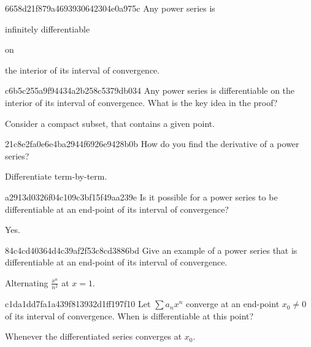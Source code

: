 \begin{note}{6658d21f879a4693930642304e0a975c}
    Any power series is \begin{icloze}{2}infinitely differentiable\end{icloze} on \begin{icloze}{1}the interior of its interval of convergence.\end{icloze}
\end{note}

\begin{note}{c6b5c255a9f94434a2b258c5379db034}
    Any power series is differentiable on the interior of its interval of convergence.
    What is the key idea in the proof?

    \begin{cloze}{1}
        Consider a compact subset, that contains a given point.
    \end{cloze}
\end{note}

\begin{note}{21c8e2fa0e6e4ba2944f6926e9428b0b}
    How do you find the derivative of a power series?

    \begin{cloze}{1}
        Differentiate term-by-term.
    \end{cloze}
\end{note}

\begin{note}{a2913d0326f04c109c3bf15f49aa239e}
    Is it possible for a power series to be differentiable at an end-point of its interval of convergence?

    \begin{cloze}{1}
        Yes.
    \end{cloze}
\end{note}

\begin{note}{84c4cd40364d4c39af2f53c8cd3886bd}
    Give an example of a power series that is differentiable at an end-point of its interval of convergence.

    \begin{cloze}{1}
        Alternating \({ \frac{x^{n}}{n^2} }\) at \({ x = 1 }\).
    \end{cloze}
\end{note}

\begin{note}{c1da1dd7fa1a439f813932d1ff197f10}
    Let \({ \sum a_n x^{n} }\) converge at an end-point \({ x_0 \neq 0 }\) of its interval of convergence.
    When is differentiable at this point?

    \begin{cloze}{1}
        Whenever the differentiated series converges at \({ x_0 }\).
    \end{cloze}
\end{note}

